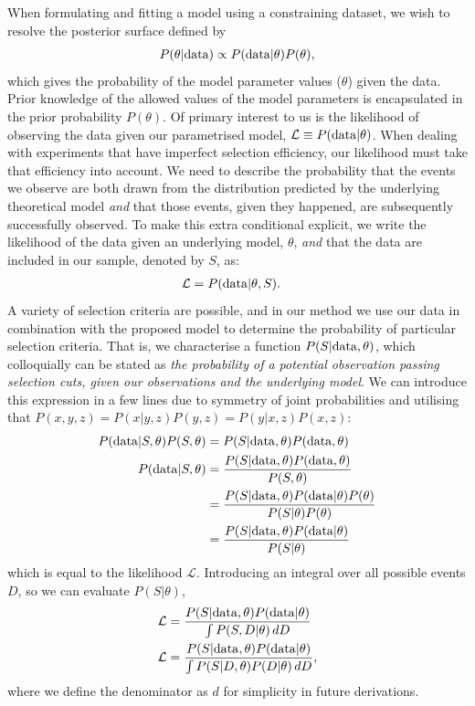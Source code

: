 \documentclass[a4paper,fleqn,usenatbib]{mnras}
\begin{document}
When formulating and fitting a model using a constraining dataset, we wish to resolve the posterior surface defined by
\begin{align}
P(\theta | {\rm data}) \propto P({\rm data} | \theta) P(\theta),
\end{align}
which gives the probability of the model parameter values ($\theta$) given the data.  Prior knowledge of the allowed values of the model parameters is encapsulated in the prior probability $P(\theta)$. Of primary interest to us is the likelihood of observing the data given our parametrised model, $\mathcal{L} \equiv P({\rm data} | \theta)$. When dealing with experiments that have imperfect selection efficiency, our likelihood must take that efficiency into account.  We need to describe the probability that the events we observe are both drawn from the distribution predicted by the underlying theoretical model \textit{and} that those events, given they happened, are subsequently successfully observed.  To make this extra conditional explicit, we write the likelihood of the data given an underlying model, $\theta$, \textit{and} that the data are included in our sample, denoted by $S$, as:
\begin{align}
\mathcal{L} &= P({\rm data} | \theta, S). \label{eq:app_like}
\end{align}
A variety of selection criteria are possible, and in our method we use our data in combination with the proposed model to determine the probability of particular selection criteria.  That is, we characterise a function $P(S|{\rm data},\theta)$, which colloquially can be stated as \textit{the probability of a potential observation passing selection cuts, given our observations and the underlying model}. We can introduce this expression in a few lines due to symmetry of joint probabilities and utilising that $P(x,y,z) = P(x|y,z)P(y,z) = P(y|x, z)P(x, z)$:
\begin{align}
P({\rm data} | S , \theta) P(S, \theta) &= P(S | {\rm data}, \theta) P({\rm data}, \theta)\\
P({\rm data} | S , \theta) &= \frac{ P(S | {\rm data}, \theta) P({\rm data}, \theta) }{ P(S, \theta) }\\
&= \frac{ P(S | {\rm data}, \theta) P({\rm data} | \theta) P(\theta)}{ P(S | \theta)  P(\theta)}\\
&= \frac{ P(S | {\rm data}, \theta) P({\rm data} | \theta)}{ P(S | \theta) }
\end{align}
which is equal to the likelihood $\mathcal{L}$. Introducing an integral over all possible events $D$, so we can evaluate $P(S|\theta)$, 
\begin{align}
\mathcal{L}&= \frac{P(S|{\rm data},\theta) P({\rm data}|\theta)}{\int P(S, D|\theta)\, dD} \\
\mathcal{L} &= \frac{P(S|{\rm data},\theta) P({\rm data}|\theta)}{\int P(S | D, \theta) P(D|\theta)\, dD}, \label{eq:app_main}
\end{align}
where we define the denominator as $d$ for simplicity in future derivations.
\end{document}
